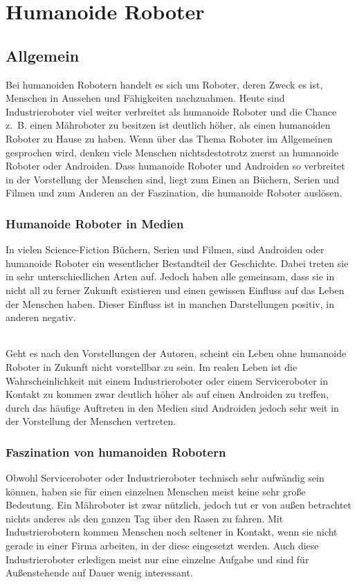\chapter{Humanoide Roboter}\label{sec:humanoide-roboter}
\section{Allgemein}\label{sec:allgemein}
Bei humanoiden Robotern handelt es sich um Roboter,
deren Zweck es ist, Menschen in Aussehen und Fähigkeiten nachzuahmen. Heute sind
Industrieroboter viel weiter verbreitet als humanoide Roboter und die Chance
z.~B. einen Mähroboter zu besitzen ist deutlich höher, als einen humanoiden
Roboter zu Hause zu haben. Wenn über das Thema Roboter im Allgemeinen gesprochen
wird, denken viele Menschen nichtsdestotrotz zuerst an humanoide Roboter oder
Androiden. Dass humanoide Roboter und Androiden so verbreitet in der
Vorstellung der Menschen sind, liegt zum Einen an Büchern, Serien und Filmen
und zum Anderen an der Faszination, die humanoide Roboter auslösen.
\cite{Dautenhahn2011}

\subsection{Humanoide Roboter in Medien}
In vielen Science-Fiction Büchern, Serien und Filmen, sind Androiden oder
humanoide Roboter ein wesentlicher Bestandteil der Geschichte. Dabei treten sie
in sehr unterschiedlichen Arten auf. Jedoch haben alle gemeinsam, dass sie in
nicht all zu ferner Zukunft existieren und einen gewissen Einfluss auf das Leben
der Menschen haben. Dieser Einfluss ist in manchen Darstellungen positiv, in
anderen negativ.

\subparagraph{}
Geht es nach den Vorstellungen der Autoren,
scheint ein Leben ohne humanoide Roboter in Zukunft nicht vorstellbar zu sein.
Im realen Leben ist die Wahrscheinlichkeit mit einem Industrieroboter oder einem
Serviceroboter in Kontakt zu kommen zwar deutlich höher als auf einen Androiden
zu treffen, durch das häufige Auftreten in den Medien sind Androiden jedoch
sehr weit in der Vorstellung der Menschen vertreten. \cite{Dautenhahn2011}

\subsection{Faszination von humanoiden Robotern}
Obwohl Serviceroboter oder Industrieroboter technisch sehr aufwändig sein
können, haben sie für einen einzelnen Menschen meist keine sehr große Bedeutung.
Ein Mähroboter ist zwar nützlich, jedoch tut er von außen betrachtet nichts
anderes als den ganzen Tag über den Rasen zu fahren. Mit Industrierobotern
kommen Menschen noch seltener in Kontakt, wenn sie nicht gerade in einer Firma
arbeiten, in der diese eingesetzt werden. Auch diese Industrieroboter erledigen
meist nur eine einzelne Aufgabe und sind für Außenstehende auf Dauer wenig
interessant.

